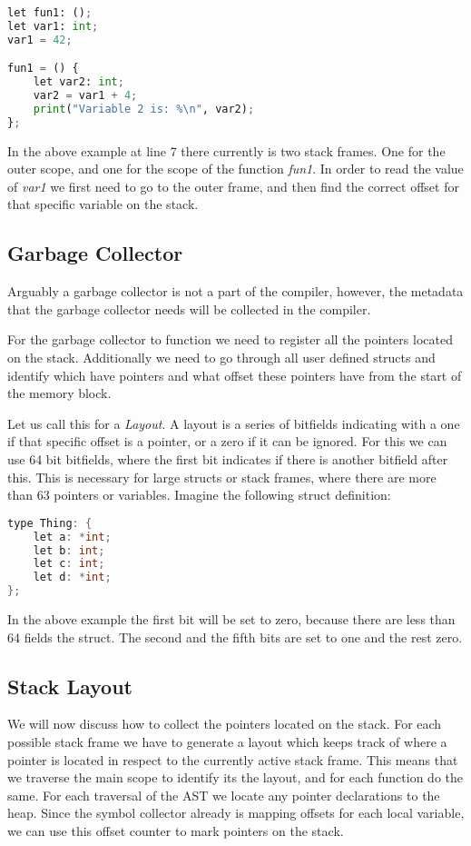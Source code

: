 \begin{lstlisting}[language=Python,title=Static Scoping]
let fun1: ();
let var1: int;
var1 = 42;

fun1 = () {
    let var2: int;
    var2 = var1 + 4;
    print("Variable 2 is: %\n", var2);
};
\end{lstlisting}

In the above example at line 7 there currently is two stack frames. One for the outer scope, and one for the scope of the function \textit{fun1}. In order to read the value of \textit{var1} we first need to go to the outer frame, and then find the correct offset for that specific variable on the stack.

\subsection{Garbage Collector}
Arguably a garbage collector is not a part of the compiler, however, the metadata that the garbage collector needs will be collected in the compiler.


For the garbage collector to function we need to register all the pointers located on the stack. Additionally we need to go through all user defined structs and identify which have pointers and what offset these pointers have from the start of the memory block. 

Let us call this for a \textit{Layout}. A layout is a series of bitfields indicating with a one if that specific offset is a pointer, or a zero if it can be ignored. For this we can use 64 bit bitfields, where the first bit indicates if there is another bitfield after this. This is necessary for large structs or stack frames, where there are more than 63 pointers or variables. Imagine the following struct definition:

\begin{lstlisting}[language=C,keywords={Thing, int},title=Type Definition]
type Thing: {
    let a: *int;
    let b: int;
    let c: int;
    let d: *int;
};
\end{lstlisting}

In the above example the first bit will be set to zero, because there are less than 64 fields the struct. The second and the fifth bits are set to one and the rest zero. 

\subsection{Stack Layout}
We will now discuss how to collect the pointers located on the stack. For each possible stack frame we have to generate a layout which keeps track of where a pointer is located in respect to the currently active stack frame. This means that we traverse the main scope to identify its the layout, and for each function do the same. For each traversal of the AST we locate any pointer declarations to the heap. Since the symbol collector already is mapping offsets for each local variable, we can use this offset counter to mark pointers on the stack. 

